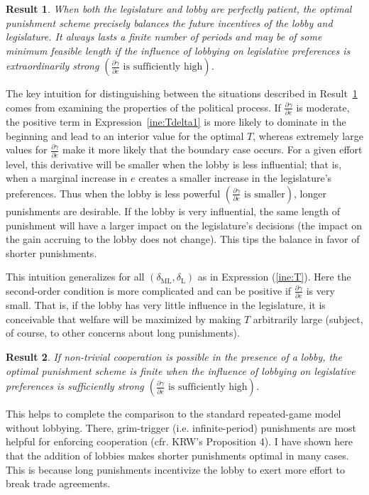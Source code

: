 \documentclass[authoryear, review]{elsarticle}
\newtheorem{result}{Result}
\newcommand{\ga}{\gamma}
\newcommand{\de}{\delta}
\begin{document}
\begin{result}
  When both the legislature and lobby are perfectly patient, the optimal punishment scheme precisely balances the future incentives of the lobby and legislature. It always lasts a finite number of periods and may be of some minimum feasible length if the influence of lobbying on legislative preferences is extraordinarily strong $\left(\frac{\partial \ga}{\partial e}\text{ is sufficiently high}\right)$.
  \label{res:opt1}
\end{result}

The key intuition for distinguishing between the situations described in Result~\ref{res:opt1} comes from examining the properties of the political process. If $\frac{\partial \ga}{\partial e}$ is moderate, the positive term in Expression~\ref{ine:Tdelta1} is more likely to dominate in the beginning and lead to an interior value for the optimal $T$, whereas extremely large values for $\frac{\partial \ga}{\partial e}$ make it more likely that the boundary case occurs. For a given effort level, this derivative will be smaller when the lobby is less influential; that is, when a marginal increase in $e$ creates a smaller increase in the legislature's preferences. Thus when the lobby is less powerful $\left(\frac{\partial \ga}{\partial e}\text{ is smaller}\right)$, longer punishments are desirable. If the lobby is very influential, the same length of punishment will have a larger impact on the legislature's decisions (the impact on the gain accruing to the lobby does not change). This tips the balance in favor of shorter punishments.

This intuition generalizes for all $\left(\de_\text{ML},\de_\text{L}\right)$ as in Expression (\ref{ine:T}). Here the second-order condition is more complicated and can be positive if $\frac{\partial \ga}{\partial e}$ is very small. That is, if the lobby has very little influence in the legislature, it is conceivable that welfare will be maximized by making $T$ arbitrarily large (subject, of course, to other concerns about long punishments).

\begin{result}
  If non-trivial cooperation is possible in the presence of a lobby, the optimal punishment scheme is finite when the influence of lobbying on legislative preferences is sufficiently strong $\left(\frac{\partial \ga}{\partial e}\text{ is sufficiently high}\right)$.
\end{result}

This helps to complete the comparison to the standard repeated-game model without lobbying. There, grim-trigger (i.e. infinite-period) punishments are most helpful for enforcing cooperation (cfr. KRW's Proposition 4). I have shown here that the addition of lobbies makes shorter punishments optimal in many cases. This is because long punishments incentivize the lobby to exert more effort to break trade agreements.
\end{document}

